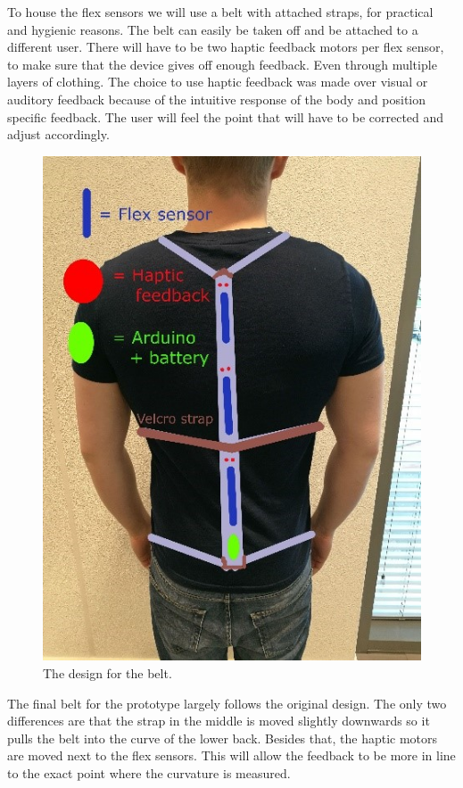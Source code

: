 \documentclass[sigconf]{acmart}
\begin{document}
To house the flex sensors we will use a belt with attached straps, for practical and hygienic reasons. The belt can easily be taken off and be attached to a different user. There will have to be two haptic feedback motors per flex sensor, to make sure that the device gives off enough feedback. Even through multiple layers of clothing. The choice to use haptic feedback was made over visual or auditory feedback because of the intuitive response of the body and position specific feedback. The user will feel the point that will have to be corrected and adjust accordingly.
\begin{figure}[h]
\centering
\includegraphics[scale=1]{Ben_Prototype.jpg}
\caption{The design for the belt.}
\end{figure}


The final belt for the prototype largely follows the original design. The only two differences are that the strap in the middle is moved slightly downwards so it pulls the belt into the curve of the lower back. Besides that, the haptic motors are moved next to the flex sensors. This will allow the feedback to be more in line to the exact point where the curvature is measured.
\end{document}
